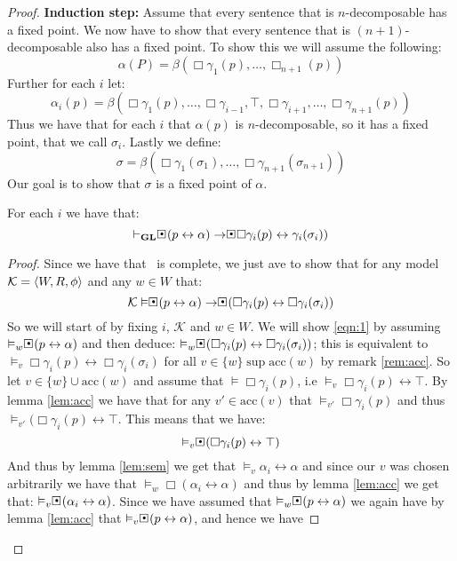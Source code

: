 \documentclass[../main.tex]{subfiles}
\begin{document}
\begin{proof}
	\textbf{Induction step:}
	Assume that every sentence that is $n$-decomposable has a fixed point.
	We now have to show that every sentence that is $(n+1)$-decomposable
	also has a fixed point. To show this we will assume the following:
	$$\alpha(P)=\beta(\Box\gamma_1(p),\ldots,\Box_{n+1}(p))$$
	Further for each $i$ let:
	$$\alpha_i(p)=\beta(\Box\gamma_1(p),\ldots,\Box\gamma_{i-1},\top,\Box\gamma_{i+1},\ldots,\Box\gamma_{n+1}(p))$$
	Thus we have that for each $i$ that $\alpha(p)$ is $n$-decomposable,
	so it has a fixed point, that we call $\sigma_i$. Lastly we define:
	$$\sigma=\beta(\Box\gamma_1(\sigma_1),\ldots,\Box\gamma_{n+1}(\sigma_{n+1}))$$
	Our goal is to show that $\sigma$ is a fixed point of $\alpha$.
	\begin{lem}
		\label{lem:fix}
		For each $i$ we have that:
		$$\vdash_\GL\sBox(p\leftrightarrow\alpha)\rightarrow\sBox\Box\gamma_i(p)\leftrightarrow\gamma_i(\sigma_i))$$
	\end{lem}
	\begin{proof}
		Since we have that \GL\ is complete, we just ave to show that
		for any model $\mathcal{K}=\langle W,R,\phi\rangle$ and any $w\in W$
		that:
		\begin{equation}
		\label{eqn:1}
			\mathcal{K}\vDash\sBox(p\leftrightarrow\alpha)\rightarrow\sBox(\Box\gamma_i(p)\leftrightarrow
		\Box\gamma_i(\sigma_i))
	\end{equation}
		So we will start of by fixing $i$, $\mathcal{K}$ and $w\in W$.
		We will show \ref{eqn:1} by assuming
		$\vDash_w\sBox(p\leftrightarrow\alpha)$ and then deduce:
		$\vDash_w\sBox(\Box\gamma_i(p)\leftrightarrow\Box\gamma_i(\sigma_i))$;
		this is equivalent to $\vDash_v\Box
		\gamma_i(p)\leftrightarrow\Box\gamma_i(\sigma_i)$ for all
		$v\in\{w\}\sup\text{acc}(w)$ by remark \ref{rem:acc}. So let
		$v\in\{w\}\cup\text{acc}(w)$ and assume that
		$\vDash\Box\gamma_i(p)$, i.e
		$\vDash_v\Box\gamma_i(p)\leftrightarrow\top$. By lemma
		\ref{lem:acc} we have that for any $v'\in\text{acc}(v)$ that
		$\vDash_{v'}\Box\gamma_i(p)$ and thus
		$\vDash_{v'}(\Box\gamma_i(p)\leftrightarrow\top$. This means
		that we have:
		$$\vDash_v\sBox(\Box\gamma_i(p)\leftrightarrow\top)$$
		And thus by lemma \ref{lem:sem} we get that
		$\vDash_v\alpha_i\leftrightarrow\alpha$ and since our $v$ was
		chosen arbitrarily we have that
		$\vDash_w\Box(\alpha_i\leftrightarrow\alpha)$ and thus by
		lemma \ref{lem:acc} we get that:
		$\vDash_v\sBox(\alpha_i\leftrightarrow\alpha)$. Since we have
		assumed that $\vDash_w\sBox(p\leftrightarrow\alpha)$ we again
		have by lemma \ref{lem:acc} that
		$\vDash_v\sBox(p\leftrightarrow\alpha)$, and hence we have

\end{proof}
\end{proof}
\end{document}
